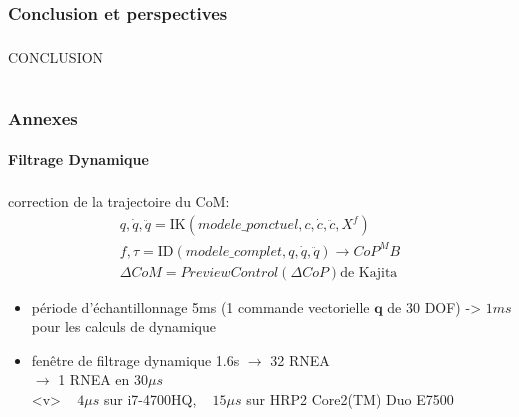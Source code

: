 \documentclass[10pt]{beamer}
\begin{document}

\section{Conclusion et perspectives}

\begin{frame}
  \frametitle{}
  
  \begin{center}
  \centering \huge{CONCLUSION}
  \end{center}
  
\end{frame}


\part{}
\section{Annexes}

\subsection{Filtrage Dynamique}

\hypertarget{app_filDyn}{}

\begin{frame}
  \frametitle{}
  
  
  correction de la trajectoire du CoM:
	\begin{align*}
	  q,\dot{q},\ddot{q} = \mathrm{IK}(modele\_ponctuel, c, \dot{c}, \ddot{c}, X^f) \\
	  f,\tau = \mathrm{ID}(modele\_complet,q,\dot{q},\ddot{q}) \longrightarrow CoP^MB \\
	  \Delta CoM = PreviewControl(\Delta CoP) \text{de Kajita}
	\end{align*}
  
  	\begin{itemize}
	\item période d'échantillonnage 5ms (1 commande vectorielle $\mathbf{q}$ de 30 DOF) -> $1ms$ pour les calculs de dynamique
	\item fenêtre de filtrage dynamique 1.6s $\longrightarrow$ 32 RNEA \\
	      $\longrightarrow$ 1 RNEA en $30\mu s$ \\
	      <v> ~ $4\mu s$ sur i7-4700HQ, ~ $15\mu s$ sur HRP2 Core2(TM) Duo E7500
	\end{itemize}
  
\end{frame}
\end{document}
